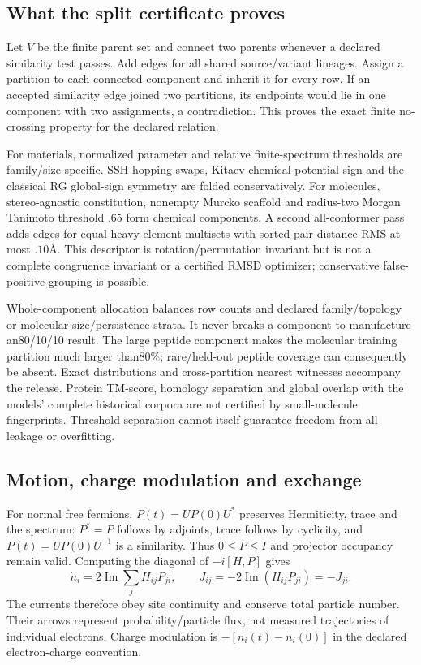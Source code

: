 \subsection{What the split certificate proves}
Let $V$ be the finite parent set and connect two parents whenever a declared
similarity test passes. Add edges for all shared source/variant lineages.
Assign a partition to each connected component and inherit it for every row.
If an accepted similarity edge joined two partitions, its endpoints would lie
in one component with two assignments, a contradiction. This proves the exact
finite no-crossing property for the declared relation.

For materials, normalized parameter and relative finite-spectrum thresholds
are family/size-specific. SSH hopping swaps, Kitaev chemical-potential sign
and the classical RG global-sign symmetry are folded conservatively. For
molecules, stereo-agnostic constitution, nonempty Murcko scaffold and
radius-two Morgan Tanimoto threshold $.65$ form chemical components. A second
all-conformer pass adds edges for equal heavy-element multisets with sorted
pair-distance RMS at most $.10$\AA. This descriptor is rotation/permutation
invariant but is not a complete congruence invariant or a certified RMSD
optimizer; conservative false-positive grouping is possible.

Whole-component allocation balances row counts and declared family/topology
or molecular-size/persistence strata. It never breaks a component to manufacture
an80/10/10 result. The large peptide component makes the molecular training
partition much larger than80\%; rare/held-out peptide coverage can consequently
be absent. Exact distributions and cross-partition nearest witnesses accompany
the release. Protein TM-score, homology separation and global overlap with the
models' complete historical corpora are not certified by small-molecule
fingerprints. Threshold separation cannot itself guarantee freedom from all
leakage or overfitting.

\subsection{Motion, charge modulation and exchange}
For normal free fermions, $P(t)=UP(0)U^*$ preserves Hermiticity, trace and the
spectrum: $P^*=P$ follows by adjoints, trace follows by cyclicity, and
$P(t)=U P(0)U^{-1}$ is a similarity. Thus $0\leq P\leq I$ and projector
occupancy remain valid. Computing the diagonal of $-i[H,P]$ gives
\[
 \dot n_i=2\operatorname{Im}\sum_jH_{ij}P_{ji},\qquad
 J_{ij}=-2\operatorname{Im}(H_{ij}P_{ji})=-J_{ji}.
\]
The currents therefore obey site continuity and conserve total particle number.
Their arrows represent probability/particle flux, not measured trajectories of
individual electrons. Charge modulation is $-[n_i(t)-n_i(0)]$ in the declared
electron-charge convention.

